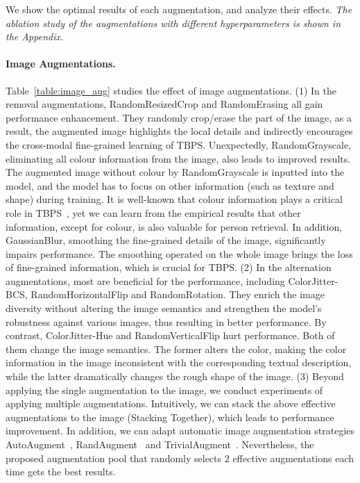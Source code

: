 \documentclass[letterpaper]{article} %
\begin{document}
We show the optimal results of each augmentation, and analyze their effects.
\emph{The ablation study of the augmentations with different hyperparameters is shown in the Appendix.}

\paragraph{Image Augmentations.} 
Table~\ref{table:image_aug} studies the effect of image augmentations.
(1) In the removal augmentations, RandomResizedCrop and RandomErasing all gain performance enhancement. 
They randomly crop/erase the part of the image, as a result, the augmented image highlights the local details and indirectly encourages the cross-modal fine-grained learning of TBPS.
Unexpectedly, RandomGrayscale, eliminating all colour information from the image, also leads to improved results.
The augmented image without colour by RandomGrayscale is inputted into the model, and the model has to focus on other information (such as texture and shape) during training.
It is well-known that colour information plays a critical role in TBPS~\cite{wu2021lapscore,wang2022caibc}, yet we can learn from the empirical results that other information, except for colour, is also valuable for person retrieval.
In addition, GaussianBlur, smoothing the fine-grained details of the image, significantly impairs performance.
The smoothing operated on the whole image brings the loss of fine-grained information, which is crucial for TBPS.
(2) In the alternation augmentations, most are beneficial for the performance, including ColorJitter-BCS, RandomHorizontalFlip and RandomRotation. 
They enrich the image diversity without altering the image semantics and strengthen the model's robustness against various images, thus resulting in better performance. By contrast, ColorJitter-Hue and RandomVerticalFlip hurt performance. Both of them change the image semantics. 
The former alters the color, making the color information in the image inconsistent with the corresponding textual description, while the latter dramatically changes the rough shape of the image.
(3) Beyond applying the single augmentation to the image, we conduct experiments of applying multiple augmentations.
Intuitively, we can stack the above effective augmentations to the image (Stacking Together), which leads to performance improvement.
In addition, we can adapt automatic image augmentation strategies AutoAugment~\cite{cubuk2018autoaugment}, RandAugment~\cite{cubuk2020randaugment} and TrivialAugment~\cite{muller2021trivialaugment}.
Nevertheless, the proposed augmentation pool that randomly selects $2$ effective augmentations each time gets the best results.
\end{document}

